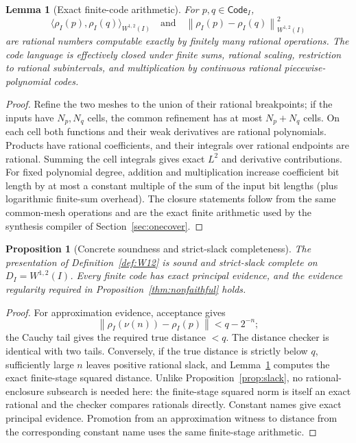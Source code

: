 \documentclass[11pt]{article}
\newtheorem{proposition}[theorem]{Proposition}
\newtheorem{lemma}[theorem]{Lemma}
\theoremstyle{definition}
\newcommand{\norm}[1]{\left\lVert #1 \right\rVert}
\newcommand{\Code}{\mathsf{Code}}
\begin{document}
\begin{lemma}[Exact finite-code arithmetic]\label{lem:exactW12}
For $p,q\in\Code_I$,
\[
 \langle\rho_I(p),\rho_I(q)\rangle_{W^{1,2}(I)}
 \quad\text{and}\quad
 \norm{\rho_I(p)-\rho_I(q)}_{W^{1,2}(I)}^2
\]
are rational numbers computable exactly by finitely many rational operations.  The code
language is effectively closed under finite sums, rational scaling, restriction to
rational subintervals, and multiplication by continuous rational piecewise-polynomial
codes.
\end{lemma}

\begin{proof}
Refine the two meshes to the union of their rational breakpoints; if the inputs have
$N_p,N_q$ cells, the common refinement has at most $N_p+N_q$ cells.  On each cell both functions and
their weak derivatives are rational polynomials.  Products have rational coefficients,
and their integrals over rational endpoints are rational.  Summing the cell integrals gives exact $L^2$ and derivative contributions.  For fixed
polynomial degree, addition and multiplication increase coefficient bit length by at most
a constant multiple of the sum of the input bit lengths (plus logarithmic finite-sum
overhead).  The closure statements follow from the same common-mesh operations and are
the exact finite arithmetic used by the synthesis compiler of Section~\ref{sec:onecover}.
\end{proof}

\begin{proposition}[Concrete soundness and strict-slack completeness]\label{prop:W12sound}
The presentation of Definition~\ref{def:W12} is sound and strict-slack complete on
$D_I=W^{1,2}(I)$.  Every finite code has exact principal evidence, and the evidence
regularity required in Proposition~\ref{thm:nonfaithful} holds.
\end{proposition}

\begin{proof}
For approximation evidence, acceptance gives
\[
 \norm{\rho_I(\nu(n))-\rho_I(p)}<q-2^{-n};
\]
the Cauchy tail gives the required true distance $<q$.  The distance checker is identical
with two tails.  Conversely, if the true distance is strictly below $q$, sufficiently large $n$ leaves positive rational slack, and Lemma~\ref{lem:exactW12}
computes the exact finite-stage squared distance.  Unlike Proposition~\ref{prop:slack}, no
rational-enclosure subsearch is needed here: the finite-stage squared norm is itself an
exact rational and the checker compares rationals directly.  Constant names give exact principal evidence.  Promotion
from an approximation witness to distance from the corresponding constant name uses the
same finite-stage arithmetic.
\end{proof}
\end{document}
